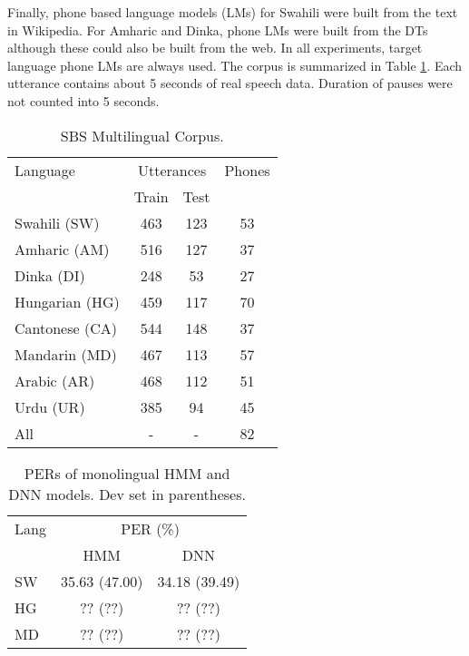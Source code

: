 \documentclass[a4paper]{article}
\begin{document}
Finally, phone based language models (LMs) for Swahili were built from the text in Wikipedia. For Amharic and Dinka, phone LMs were built from the DTs although these could also be built from the web. In all experiments, target language phone LMs are always used. The corpus is summarized in Table \ref{Tab:SBS Corpus}. Each utterance contains about 5 seconds of real speech data. Duration of pauses were not counted into 5 seconds.

\begin{table}
\begin{center}
\caption{SBS Multilingual Corpus.}
\label{Tab:SBS Corpus}
\begin{tabular}{l|c c| c}
   \hline
Language &  \multicolumn{2}{c|}{Utterances}  & Phones \\ 
                 &  Train & Test &  \\ \hline
Swahili (SW)     & 463 & 123 & 53 \\
Amharic (AM)     & 516 & 127 & 37 \\
Dinka   (DI)     & 248 &  53 & 27 \\ 
Hungarian (HG)    & 459 & 117 & 70 \\ 
Cantonese (CA)  & 544 & 148 &  37 \\ 
Mandarin (MD) & 467 & 113 &  57 \\ 
Arabic (AR) & 468 & 112 &  51 \\ 
Urdu (UR) & 385 & 94 &  45 \\ \hline
All & - & - & 82 \\ \hline
\end{tabular}
\vspace{-5mm}
\end{center}
\end{table}

\begin{table}
\centering %
\caption{PERs of monolingual HMM and DNN models. Dev set in parentheses.}
\begin{tabular}{l|c c}
   \hline
Lang  & \multicolumn{2}{c}{PER (\%)} \\
          & HMM     & DNN   \\ \hline
SW        & 35.63 (47.00)   & 34.18 (39.49)   \\
HG        & ?? (??)   & ?? (??)   \\ 
MD        & ?? (??)   & ?? (??)  \\ \hline 
\end{tabular}
\vspace{-5mm}
\label{Tab:PER_Matched_Monolingual}
\end{table}
\end{document}
